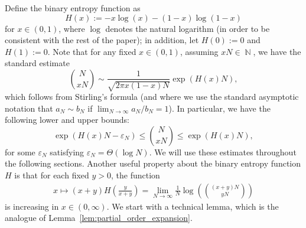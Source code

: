 \documentclass[11pt]{article}
\numberwithin{equation}{section}
\DeclareMathOperator{\N}{\mathbb{N}} %
\newcommand{\eps}{\varepsilon} %
\newcommand{\be}{\begin{equation}}
\newcommand{\ee}{\end{equation}}
\theoremstyle{definition}
\begin{document}
Define the binary entropy function as 
\be \label{eq:binentropy}
    H(x):= - x\log(x)-(1-x)\log(1-x)
\ee 
for $x \in (0,1)$, where $\log$ denotes the natural logarithm (in order to be consistent with the rest of the paper); in addition, let $H(0) := 0$ and $H(1) := 0$.  
Note that for any fixed $x \in (0,1)$, assuming $x N \in \N$, we have the standard estimate 
\begin{equation}\label{eq:binom_coeff_entropy_asymp}
    \binom{N}{xN} 
    \sim 
    \frac{1}{\sqrt{2\pi x(1-x) N}} \exp \left( H(x) N \right),
\end{equation}
which follows from Stirling's formula (and where we use the standard asymptotic notation that $a_{N} \sim b_{N}$ if $\lim_{N \to \infty} a_{N} / b_{N} = 1$). In particular, we have the following lower and upper bounds: 
\begin{equation}\label{eq:binom_coeff_entropy_bounds}
    \exp \left( H(x) N - \eps_{N}\right)
    \leq 
    \binom{N}{xN} 
    \leq
    \exp \left( H(x) N \right),
\end{equation}
for some $\eps_{N}$ satisfying $\eps_{N} = \Theta \left( \log N \right)$. 
We will use these estimates throughout the following sections. Another useful property about the binary entropy function $H$ is that for each fixed $y>0$, the function
\begin{align}\label{eq:increasing weighted bin entrop}
    x \mapsto (x+y)H\left( \frac{y}{x+y} \right) = \lim_{N\to \infty} \frac{1}{N} \log \left( \binom{(x+y)N}{y N} \right)
\end{align}
is increasing in $x \in (0,\infty)$.
We start with a technical lemma, which is the analogue of Lemma~\ref{lem:partial_order_expansion}. 
\end{document}
